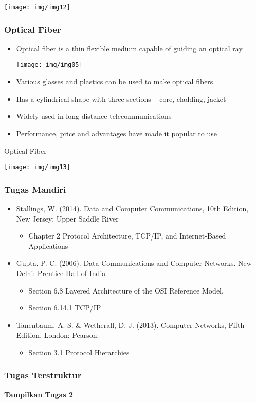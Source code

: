\documentclass[pdflatex,compress]{beamer}
\begin{document}
\begin{frame}
	\begin{center}
		\texttt{[image: img/img12]}
	\end{center}
\end{frame}

\begin{frame}
	\frametitle{Optical Fiber}
	\begin{itemize}
		\item Optical fiber is a thin flexible medium capable of guiding an optical ray
		\begin{center}
			\texttt{[image: img/img05]}
		\end{center}
		\item Various glasses and plastics can be used to make optical fibers
		\item Has a cylindrical shape with three sections – core, cladding, jacket
		\item Widely used in long distance telecommunications
		\item Performance, price and advantages have made it popular to use
	\end{itemize}
\end{frame}

\begin{frame}{Optical Fiber}
	\begin{center}
		\texttt{[image: img/img13]}
	\end{center}
\end{frame}

\begin{frame}
	\frametitle{Tugas Mandiri}
	\begin{itemize}
		\item Stallings, W. (2014). Data and Computer Communications, 10th Edition, New Jersey: Upper Saddle River\\
		\begin{itemize}
			\item Chapter 2 Protocol Architecture, TCP/IP, and Internet-Based Applications
		\end{itemize}
		\item Gupta, P. C. (2006). Data Communications and Computer Networks. New Delhi: Prentice Hall of India\\
		\begin{itemize}
			\item Section 6.8 Layered Architecture of the OSI Reference Model.
			\item Section 6.14.1 TCP/IP
		\end{itemize}
		\item Tanenbaum, A. S. \& Wetherall, D. J. (2013). Computer Networks, Fifth Edition. London: Pearson.\\
		\begin{itemize}
			\item Section 3.1 Protocol Hierarchies
		\end{itemize}
	\end{itemize}
\end{frame}

\begin{frame}
	\frametitle{Tugas Terstruktur}
	\textbf{Tampilkan Tugas 2}
\end{frame}
\end{document}
